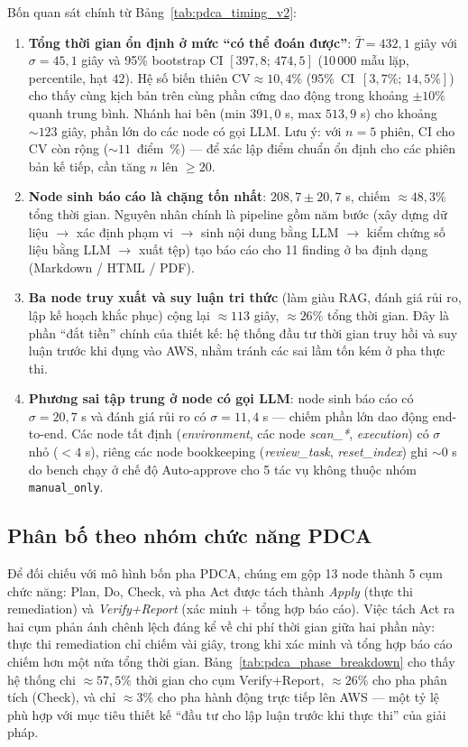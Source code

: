 Bốn quan sát chính từ Bảng~\ref{tab:pdca_timing_v2}:

\begin{enumerate}
  \item \textbf{Tổng thời gian ổn định ở mức ``có thể đoán được''}: $\bar{T} = 432{,}1$ giây với $\sigma = 45{,}1$ giây và 95\% bootstrap CI \mbox{$[397{,}8;\,474{,}5]$} (10\,000 mẫu lặp, percentile, hạt $42$). Hệ số biến thiên $\text{CV} \approx 10{,}4\%$ \mbox{(95\% CI $[3{,}7\%;\,14{,}5\%]$)} cho thấy cùng kịch bản trên cùng phần cứng dao động trong khoảng $\pm 10\%$ quanh trung bình. Nhánh hai bên (min $391{,}0$ s, max $513{,}9$ s) cho khoảng $\sim 123$ giây, phần lớn do các node có gọi LLM. Lưu ý: với $n = 5$ phiên, CI cho CV còn rộng \mbox{($\sim 11$ điểm \%)} --- để xác lập điểm chuẩn ổn định cho các phiên bản kế tiếp, cần tăng $n$ lên $\ge 20$.
  \item \textbf{Node sinh báo cáo là chặng tốn nhất}: $208{,}7 \pm 20{,}7$ s, chiếm $\approx 48{,}3\%$ tổng thời gian. Nguyên nhân chính là pipeline gồm năm bước (xây dựng dữ liệu $\rightarrow$ xác định phạm vi $\rightarrow$ sinh nội dung bằng LLM $\rightarrow$ kiểm chứng số liệu bằng LLM $\rightarrow$ xuất tệp) tạo báo cáo cho 11 finding ở ba định dạng (Markdown / HTML / PDF).
  \item \textbf{Ba node truy xuất và suy luận tri thức} (làm giàu RAG, đánh giá rủi ro, lập kế hoạch khắc phục) cộng lại $\approx 113$ giây, $\approx 26\%$ tổng thời gian. Đây là phần ``đắt tiền'' chính của thiết kế: hệ thống đầu tư thời gian truy hồi và suy luận trước khi đụng vào AWS, nhằm tránh các sai lầm tốn kém ở pha thực thi.
  \item \textbf{Phương sai tập trung ở node có gọi LLM}: node sinh báo cáo có $\sigma = 20{,}7$ s và đánh giá rủi ro có $\sigma = 11{,}4$ s --- chiếm phần lớn dao động end-to-end. Các node tất định (\textit{environment}, các node \textit{scan\_*}, \textit{execution}) có $\sigma$ nhỏ ($<4$ s), riêng các node bookkeeping (\textit{review\_task}, \textit{reset\_index}) ghi $\sim 0$ s do bench chạy ở chế độ Auto-approve cho 5 tác vụ không thuộc nhóm \texttt{manual\_only}.
\end{enumerate}

\subsection{Phân bố theo nhóm chức năng PDCA}
\label{subsec:perf_pdca_phase}

Để đối chiếu với mô hình bốn pha PDCA, chúng em gộp 13 node thành 5 cụm chức năng: Plan, Do, Check, và pha Act được tách thành \emph{Apply} (thực thi remediation) và \emph{Verify+Report} (xác minh + tổng hợp báo cáo). Việc tách Act ra hai cụm phản ánh chênh lệch đáng kể về chi phí thời gian giữa hai phần này: thực thi remediation chỉ chiếm vài giây, trong khi xác minh và tổng hợp báo cáo chiếm hơn một nửa tổng thời gian. Bảng~\ref{tab:pdca_phase_breakdown} cho thấy hệ thống chi $\approx 57{,}5\%$ thời gian cho cụm Verify+Report, $\approx 26\%$ cho pha phân tích (Check), và chỉ $\approx 3\%$ cho pha hành động trực tiếp lên AWS --- một tỷ lệ phù hợp với mục tiêu thiết kế ``đầu tư cho lập luận trước khi thực thi'' của giải pháp.

